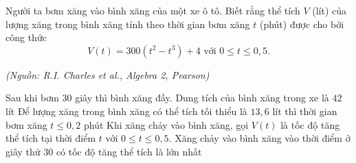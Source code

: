 \begin{vd}%
	Người ta bơm xăng vào bình xăng của một xe ô tô. Biết rằng thể tích $V$ (lít) của lượng xăng trong bình xăng tính theo thời gian bơm xăng $t$ (phút) được cho bởi công thức $$V(t)=300(t^2-t^3)+4 \text{ với } 0\le t\le 0{,}5.$$
	\begin{flushright}
		\textit{(Nguồn: R.I. Charles et al., Algebra 2, Pearson)}
	\end{flushright}
	{Sau khi bơm $30$ giây thì bình xăng đầy. Dung tích của bình xăng trong xe là $42$ lít}
	{Để lượng xăng trong bình xăng có thể tích tối thiểu là $13{,}6$ lít thì thời gian bơm xăng $t\le 0{,}2$ phút}
	{\True Khi xăng chảy vào bình xăng, gọi $V(t)$ là tốc độ tăng thể tích tại thời điểm $t$ với $0\le t\le 0{,}5$. Xăng chảy vào bình xăng vào thời điểm ở giây thứ $30$ có tốc độ tăng thể tích là lớn nhất}
\end{vd}

